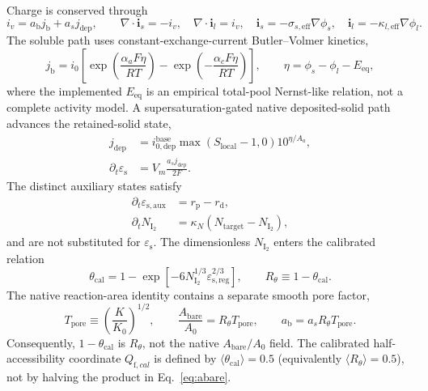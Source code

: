 \documentclass[11pt]{article}
\newcommand{\epss}{\varepsilon_{\mathrm{s}}}
\newcommand{\epsaux}{\varepsilon_{\mathrm{s,aux}}}
\newcommand{\thetacal}{\theta_{\mathrm{cal}}}
\newcommand{\Rtheta}{R_{\theta}}
\newcommand{\Tpore}{T_{\mathrm{pore}}}
\begin{document}
Charge is conserved through
\begin{equation}
i_v=a_{\mathrm b}j_{\mathrm b}+a_sj_{\mathrm{dep}},\qquad
\nabla\!\cdot\mathbf{i}_s=-i_v,\quad \nabla\!\cdot\mathbf{i}_l=i_v,
\quad \mathbf{i}_s=-\sigma_{s,\mathrm{eff}}\nabla\phi_s,
\quad \mathbf{i}_l=-\kappa_{l,\mathrm{eff}}\nabla\phi_l .
\label{eq:charge}
\end{equation}
The soluble path uses constant-exchange-current Butler--Volmer kinetics,
\begin{equation}
j_{\mathrm b}=i_0\!\left[\exp\!\left(\frac{\alpha_aF\eta}{RT}\right)-
\exp\!\left(-\frac{\alpha_cF\eta}{RT}\right)\right],\qquad
\eta=\phi_s-\phi_l-E_{\mathrm{eq}},
\label{eq:bv}
\end{equation}
where the implemented $E_{\mathrm{eq}}$ is an empirical total-pool Nernst-like relation, not a complete
activity model. A supersaturation-gated native deposited-solid path advances the retained-solid state,
\begin{align}
j_{\mathrm{dep}}&=i_{0,\mathrm{dep}}^{\mathrm{base}}\max(S_{\mathrm{local}}-1,0)
10^{\eta/A_a},\\
\partial_t\epss&=V_m\frac{a_sj_{\mathrm{dep}}}{2F}.
\label{eq:native-solid}
\end{align}
The distinct auxiliary states satisfy
\begin{align}
\partial_t\epsaux&=r_{\mathrm p}-r_{\mathrm d},\\
\partial_tN_{\mathrm{I_2}}&=\kappa_N(N_{\mathrm{target}}-N_{\mathrm{I_2}}),
\label{eq:auxiliary}
\end{align}
and are not substituted for $\epss$. The dimensionless $N_{\mathrm{I_2}}$ enters the calibrated relation
\begin{equation}
\thetacal=1-\exp\!\left[-6N_{\mathrm{I_2}}^{1/3}\varepsilon_{\mathrm{s,reg}}^{2/3}\right],
\qquad \Rtheta\equiv1-\thetacal .
\label{eq:rtheta}
\end{equation}
The native reaction-area identity contains a separate smooth pore factor,
\begin{equation}
\Tpore\equiv\left(\frac{K}{K_0}\right)^{1/2},\qquad
\frac{A_{\mathrm{bare}}}{A_0}=\Rtheta\Tpore,
\qquad a_{\mathrm b}=a_s\Rtheta\Tpore .
\label{eq:abare}
\end{equation}
Consequently, $1-\thetacal$ is $\Rtheta$, not the native $A_{\mathrm{bare}}/A_0$ field. The calibrated
half-accessibility coordinate $Q_{\mathrm f,cal}$ is defined by $\langle\thetacal\rangle=0.5$ (equivalently
$\langle\Rtheta\rangle=0.5$), not by halving the product in Eq.~\eqref{eq:abare}.
\end{document}
